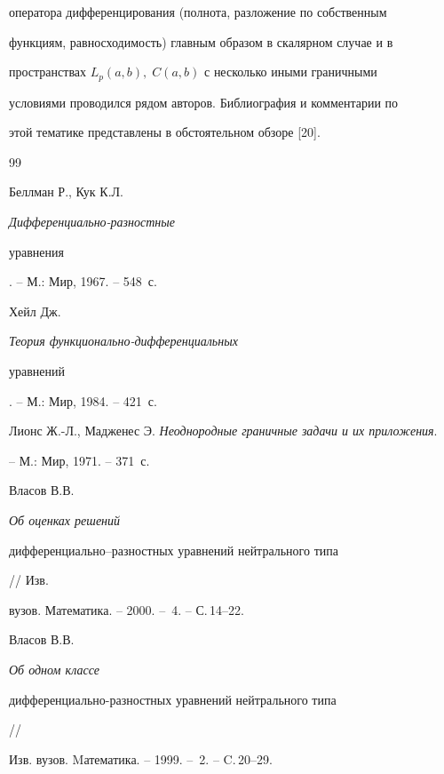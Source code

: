оператора дифференцирования (полнота, разложение по собственным


функциям, равносходимость) главным образом в скалярном случае и в


пространствах $L_p(a,b),\;C(a,b)$ с несколько иными граничными


условиями проводился рядом авторов. Библиография и комментарии по


этой тематике представлены в обстоятельном обзоре [20].








\begin{thebibliography}{99}







Беллман Р., Кук К.Л. {\it Дифференциально-разностные


уравнения}. -- М.: Мир, 1967. -- 548~с.







Хейл Дж. {\it Теория функционально-дифференциальных


уравнений}. -- М.: Мир, 1984. -- 421~с.







Лионс Ж.-Л., Мадженес Э. {\it Неоднородные граничные задачи и их приложения}.


-- М.: Мир, 1971. -- 371~с.







Власов В.В. {\it Об оценках решений


дифференциально--разностных уравнений нейтрального типа} // Изв.


вузов. Математика. -- 2000. -- \No\,4. -- С.\,14--22.







Власов В.В. {\it Об одном классе


дифференциально-разностных уравнений нейтрального типа} //


Изв. вузов. Mатематика. -- 1999. -- \No\,2. -- C.\,20--29.






\end{thebibliography}
